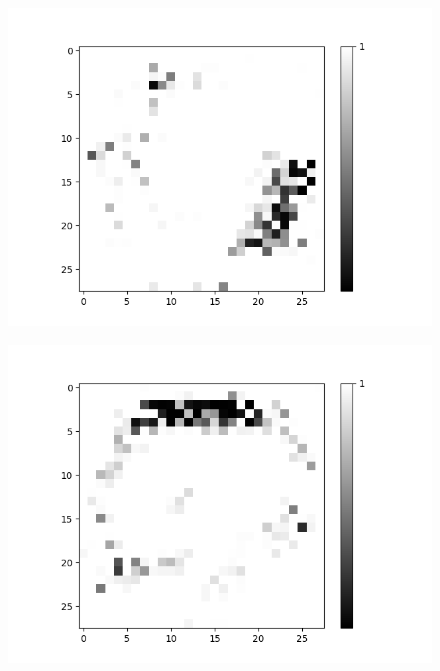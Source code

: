 \begin{minipage}[t]{0.45\textwidth}
	\vspace{0cm}
	\begin{figure}[H]
		\begin{minipage}[b]{0.45\textwidth}
			\captionsetup{labelformat=empty}
			\includegraphics[width=\textwidth]{OR-AND(W-LSM)(1)/Like/True/Layer0-Neuron-18.png}
			\label{}
		\end{minipage}
		\begin{minipage}[b]{0.45\textwidth}
			\captionsetup{labelformat=empty}
			\includegraphics[width=\textwidth]{OR-AND(W-LSM)(1)/Like/True/Layer0-Neuron-19.png}
			\label{}
		\end{minipage}
		

\end{figure}
\end{minipage}
